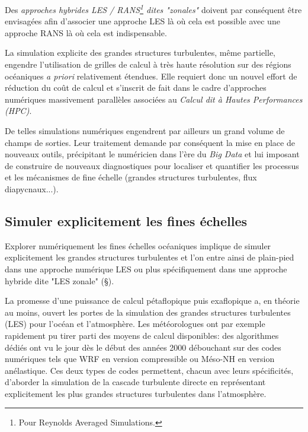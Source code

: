 Des \textit{approches hybrides LES / RANS\footnote{Pour Reynolds Averaged Simulations.} dites "zonales"} \citep{friess_modelisation_2010} doivent par conséquent être envisagées afin d'associer une approche LES là où cela est possible avec une approche RANS là où cela est indispensable.

La simulation explicite des grandes structures turbulentes, même partielle, engendre l'utilisation de grilles de calcul à très haute résolution sur des régions océaniques \textit{a priori} relativement étendues. Elle requiert donc un nouvel effort de réduction du coût de calcul et s'inscrit de fait dans le cadre d'approches numériques massivement parallèles associées au \textit{Calcul dit à Hautes Performances (HPC)}.

De telles simulations numériques engendrent par ailleurs un grand volume de champs de sorties. Leur traitement demande par conséquent la mise en place de nouveaux outils, précipitant le numéricien dans l'ère du \textit{Big Data} et lui imposant de construire de nouveaux diagnostiques pour localiser et quantifier les processus et les mécanismes de fine échelle (grandes structures turbulentes, flux diapycnaux...).


\subsection{Simuler explicitement les fines échelles}

Explorer numériquement les fines échelles océaniques implique de simuler explicitement les grandes structures turbulentes et l'on entre ainsi de plain-pied dans une approche numérique LES ou plus spécifiquement dans une approche hybride dite "LES zonale" (\S {}).

La promesse d’une puissance de calcul pétaflopique puis exaflopique a, en théorie au moins, ouvert les portes de la simulation des grandes structures turbulentes (LES) pour l’océan et l’atmosphère. Les météorologues ont par exemple rapidement pu tirer parti des moyens de calcul disponibles: des algorithmes dédiés ont vu le jour dès le début des années 2000 débouchant sur des codes numériques tels que WRF \citep{skamarock_prototypes_2001} en version compressible ou Méso-NH \citep{lac_overview_2018} en version anélastique. Ces deux types de codes permettent, chacun avec leurs spécificités, d’aborder la simulation de la cascade turbulente directe en représentant explicitement les plus grandes structures turbulentes dans l’atmosphère.

